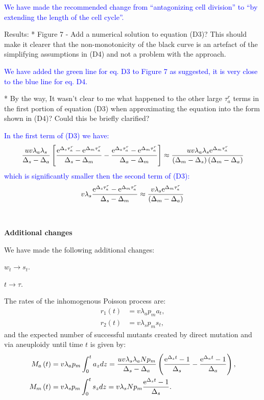 \documentclass[12pt]{extarticle}
\newcommand{\e}{{\rm e}}
\begin{document}
\textcolor{blue}{We have made the recommended change from ``antagonizing cell division'' to ``by extending the length of the cell cycle''.}  %

Results:
* Figure 7 - Add a numerical solution to equation (D3)? This should make it clearer that the non-monotonicity of the black curve is an artefact of the simplifying assumptions in (D4) and not a problem with the approach.

\textcolor{blue}{We have added the green line for eq. D3 to Figure 7 as suggested, it is very close to the blue line for eq. D4.}

* By the way, It wasn't clear to me what happened to the other large $\tau_a^r$ terms in the first portion of equation (D3) when approximating the equation into the form shown in (D4)? Could this be briefly clarified?

\textcolor{blue}{In the first term of (D3) we have: 
\begin{align*}
\frac{uv\lambda_a\lambda_s}{\Delta_s-\Delta_a}\left[\frac{\e^{\Delta_s\tau_a^r}-\e^{\Delta_m\tau_a^r}}{\Delta_s-\Delta_m}-\frac{\e^{\Delta_a\tau_a^r}-\e^{\Delta_m\tau_a^r}}{\Delta_a-\Delta_m}\right]\approx\frac{uv\lambda_a\lambda_s\e^{\Delta_m\tau_a^r}}{\left(\Delta_m-\Delta_s\right)\left(\Delta_m-\Delta_a\right)}
\end{align*}
which is significantly smaller then the second term of (D3):
\begin{align*}
v\lambda_s\frac{\e^{\Delta_s\tau_a^r}-\e^{\Delta_m\tau_a^r}}{\Delta_s-\Delta_m}\approx\frac{v\lambda_s\e^{\Delta_m\tau_a^r}}{\left(\Delta_m-\Delta_a\right)}
\end{align*}
} %
\\
\\
\textbf{Additional changes}

We have made the following additional changes:

$w_t\rightarrow s_t$. %

$t\rightarrow \tau$. %

The rates of the inhomogenous Poisson process are: %
\begin{align*}
r_1\left(t\right)&=v\lambda_ap_ma_{t},\\ 
r_2\left(t\right)&=v\lambda_sp_ms_{t},
\end{align*}
and the expected number of successful mutants created by direct mutation and via aneuploidy until time $t$ is given by:
\begin{align*}
M_a\left(t\right)&=v\lambda_ap_m\int_0^ta_{z} d z = \frac{uv\lambda_s\lambda_aNp_m}{\Delta_s-\Delta_a}\left(\frac{\e^{\Delta_st}-1}{\Delta_s}-\frac{\e^{\Delta_at}-1}{\Delta_a}\right),\\ 
M_m\left(t\right)&=v\lambda_sp_m\int_0^ts_{z} d z = v\lambda_sNp_m\frac{\e^{\Delta_s t}-1}{\Delta_s}.
\end{align*}
 
\end{document}
